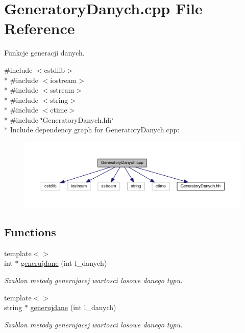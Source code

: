 \hypertarget{a00035}{}\section{Generatory\+Danych.\+cpp File Reference}
\label{a00035}


Funkcje generacji danych.  


{\ttfamily \#include $<$cstdlib$>$}\\*
{\ttfamily \#include $<$iostream$>$}\\*
{\ttfamily \#include $<$sstream$>$}\\*
{\ttfamily \#include $<$string$>$}\\*
{\ttfamily \#include $<$ctime$>$}\\*
{\ttfamily \#include \char`\"{}Generatory\+Danych.\+hh\char`\"{}}\\*
Include dependency graph for Generatory\+Danych.\+cpp\+:
\nopagebreak
\begin{figure}[H]
\begin{center}
\leavevmode
\includegraphics[width=350pt]{a00079}
\end{center}
\end{figure}
\subsection*{Functions}
\begin{DoxyCompactItemize}
\item 
{\footnotesize template$<$$>$ }\\int $\ast$ \hyperlink{a00035_adcc5cc7e15775ae8116ea54eec54c368}{generujdane} (int l\+\_\+danych)
\begin{DoxyCompactList}\small\item\em Szablon metody generujacej wartosci losowe danego typu. \end{DoxyCompactList}\item 
{\footnotesize template$<$$>$ }\\string $\ast$ \hyperlink{a00035_ab57af5d6f8c119c3ddc106324663ae85}{generujdane} (int l\+\_\+danych)
\begin{DoxyCompactList}\small\item\em Szablon metody generujacej wartosci losowe danego typu. \end{DoxyCompactList}\end{DoxyCompactItemize}


